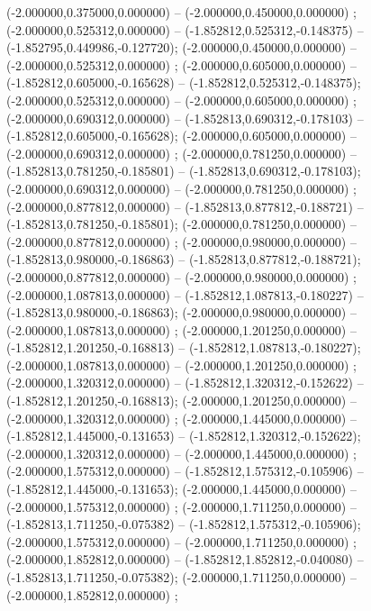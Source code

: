  (-2.000000,0.375000,0.000000) -- (-2.000000,0.450000,0.000000) ;
 (-2.000000,0.525312,0.000000) -- (-1.852812,0.525312,-0.148375) -- (-1.852795,0.449986,-0.127720);
 (-2.000000,0.450000,0.000000) -- (-2.000000,0.525312,0.000000) ;
 (-2.000000,0.605000,0.000000) -- (-1.852812,0.605000,-0.165628) -- (-1.852812,0.525312,-0.148375);
 (-2.000000,0.525312,0.000000) -- (-2.000000,0.605000,0.000000) ;
 (-2.000000,0.690312,0.000000) -- (-1.852813,0.690312,-0.178103) -- (-1.852812,0.605000,-0.165628);
 (-2.000000,0.605000,0.000000) -- (-2.000000,0.690312,0.000000) ;
 (-2.000000,0.781250,0.000000) -- (-1.852813,0.781250,-0.185801) -- (-1.852813,0.690312,-0.178103);
 (-2.000000,0.690312,0.000000) -- (-2.000000,0.781250,0.000000) ;
 (-2.000000,0.877812,0.000000) -- (-1.852813,0.877812,-0.188721) -- (-1.852813,0.781250,-0.185801);
 (-2.000000,0.781250,0.000000) -- (-2.000000,0.877812,0.000000) ;
 (-2.000000,0.980000,0.000000) -- (-1.852813,0.980000,-0.186863) -- (-1.852813,0.877812,-0.188721);
 (-2.000000,0.877812,0.000000) -- (-2.000000,0.980000,0.000000) ;
 (-2.000000,1.087813,0.000000) -- (-1.852812,1.087813,-0.180227) -- (-1.852813,0.980000,-0.186863);
 (-2.000000,0.980000,0.000000) -- (-2.000000,1.087813,0.000000) ;
 (-2.000000,1.201250,0.000000) -- (-1.852812,1.201250,-0.168813) -- (-1.852812,1.087813,-0.180227);
 (-2.000000,1.087813,0.000000) -- (-2.000000,1.201250,0.000000) ;
 (-2.000000,1.320312,0.000000) -- (-1.852812,1.320312,-0.152622) -- (-1.852812,1.201250,-0.168813);
 (-2.000000,1.201250,0.000000) -- (-2.000000,1.320312,0.000000) ;
 (-2.000000,1.445000,0.000000) -- (-1.852812,1.445000,-0.131653) -- (-1.852812,1.320312,-0.152622);
 (-2.000000,1.320312,0.000000) -- (-2.000000,1.445000,0.000000) ;
 (-2.000000,1.575312,0.000000) -- (-1.852812,1.575312,-0.105906) -- (-1.852812,1.445000,-0.131653);
 (-2.000000,1.445000,0.000000) -- (-2.000000,1.575312,0.000000) ;
 (-2.000000,1.711250,0.000000) -- (-1.852813,1.711250,-0.075382) -- (-1.852812,1.575312,-0.105906);
 (-2.000000,1.575312,0.000000) -- (-2.000000,1.711250,0.000000) ;
 (-2.000000,1.852812,0.000000) -- (-1.852812,1.852812,-0.040080) -- (-1.852813,1.711250,-0.075382);
 (-2.000000,1.711250,0.000000) -- (-2.000000,1.852812,0.000000) ;
